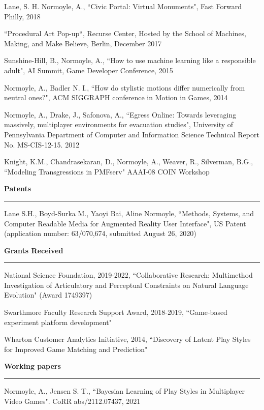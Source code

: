 Lane, S. H. Normoyle, A., ``Civic Portal: Virtual Monuments", Fast Forward Philly, 2018

``Procedural Art Pop-up``, Recurse Center, Hosted by the School of Machines, Making, and Make Believe, Berlin, December 2017 

Sunshine-Hill, B., Normoyle, A., ``How to use machine learning like a responsible adult", AI Summit, Game Developer Conference, 2015

Normoyle, A., Badler N. I., ``How do stylistic motions differ numerically from neutral ones?", ACM SIGGRAPH conference in Motion in Games, 2014

Normoyle, A., Drake, J., Safonova, A., ``Egress Online: Towards leveraging massively, multiplayer environments for evacuation studies", University of Pennsylvania Department of Computer and Information Science Technical Report No. MS-CIS-12-15. 2012

Knight, K.M., Chandrasekaran, D., Normoyle, A., Weaver, R., Silverman, B.G., ``Modeling Transgressions in PMFserv" AAAI-08 COIN Workshop

\medskip
\medskip

{\Large {\bf Patents}}
\vspace{0.1cm}
\hrule
\medskip

Lane S.H., Boyd-Surka M., Yaoyi Bai, Aline Normoyle, ``Methods, Systems, and Computer Readable Media for Augmented Reality User Interface", US Patent (application number: 63/070,674, submitted August 26, 2020)

\medskip
\medskip

{\Large {\bf Grants Received}}
\vspace{0.1cm}
\hrule
\medskip

National Science Foundation, 2019-2022, 
``Collaborative Research: Multimethod Investigation of Articulatory and Perceptual Constraints on Natural Language Evolution" (Award 1749397)

Swarthmore Faculty Research Support Award, 2018-2019, ``Game-based experiment platform development"

Wharton Customer Analytics Initiative, 2014, ``Discovery of Latent Play Styles for Improved Game Matching and Prediction"

\medskip
\medskip

{\Large {\bf  Working papers}}
\vspace{0.1cm}
\hrule
\medskip

Normoyle, A., Jensen S. T., ``Bayesian Learning of Play Styles in Multiplayer Video Games". CoRR abs/2112.07437, 2021 

